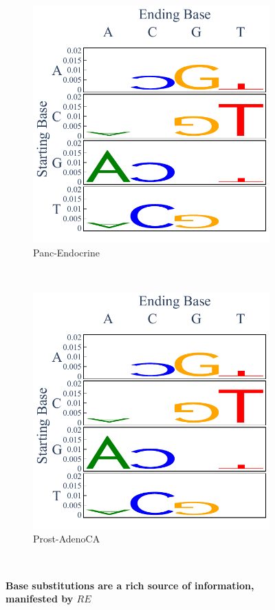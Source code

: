\begin{figure}[h!]
    \begin{subfigure}{.5\textwidth}
    \centering
    \includegraphics[scale=0.5]{graphics/spectra_Panc-Endocrine.pdf}
    \caption{Panc-Endocrine}
    \end{subfigure} 
    ~
    \begin{subfigure}{.5\textwidth}
    \centering
    \includegraphics[scale=0.5]{graphics/spectra_Prost-AdenoCA.pdf}
    \caption{Prost-AdenoCA}
    \end{subfigure} \\

    \caption{\textbf{Base substitutions are a rich source of information, manifested by $RE$}}
    \label{fig:apdx_spectra}
\end{figure}
